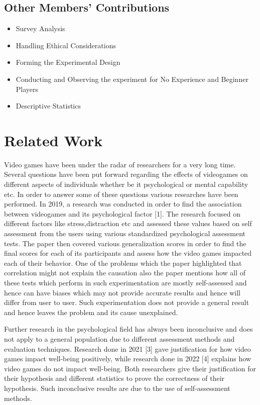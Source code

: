 \documentclass[conference]{IEEEtran}
\begin{document}
\subsection{Other Members' Contributions}
\begin{itemize}
     \item Survey Analysis
    \item Handling Ethical Considerations
    \item Forming the Experimental Design
    \item Conducting and Observing the experiment for No Experience and Beginner Players
    \item Descriptive Statistics
\end{itemize}
\section{Related Work}
\begin{flushleft}
    Video games have been under the radar of researchers for a very long time. Several questions have been put forward regarding the effects of videogames on different aspects of individuals whether be it psychological or mental capability etc. In order to answer some of these questions various researches have been performed.
\newline
In 2019, a research was conducted in order to find the association between videogames and its psychological factor [1]. The research focused on different factors like stress,distraction etc and assessed these values based on self assessment from the users using various standardized psychological assessment tests. The paper then covered various generalization scores in order to find the final scores for each of its participants and assess how the video games impacted each of their behavior. One of the problems which the paper highlighted that correlation might not explain the causation also the paper mentions how all of these tests which perform in such experimentation are mostly self-assessed and hence can have biases which may not provide accurate results and hence will differ from user to user. Such experimentation does not provide a general result and hence leaves the problem and its cause unexplained.
\end{flushleft}
\newline
\newline
\begin{flushleft}
    
Further research in the psychological field has always been inconclusive and does not apply to a general population due to different assessment methods and evaluation techniques. Research done in 2021 [3] gave justification for how video games impact well-being positively, while research done in 2022 [4] explains how video games do not impact well-being. Both researchers give their justification for their hypothesis and different statistics to prove the correctness of their hypothesis. Such inconclusive results are due to the use of self-assessment methods.
\end{flushleft}
\end{document}
